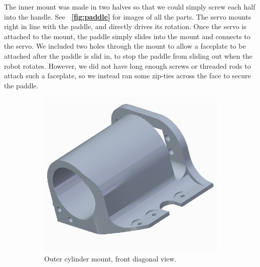 \documentclass[letterpaper, 11pt]{article}
\newcommand*{\figref}[1]{\textbf{\figurename~\ref{#1}}}
\begin{document}
The inner mount was made in two halves so that we could simply screw each half into the handle. See \figref{fig:paddle} for images of all the parts. The servo mounts right in line with the paddle, and directly drives its rotation. Once the servo is attached to the mount, the paddle simply slides into the mount and connects to the servo. We included two holes through the mount to allow a faceplate to be attached after the paddle is slid in, to stop the paddle from sliding out when the robot rotates. However, we did not have long enough screws or threaded rods to attach such a faceplate, so we instead ran some zip-ties across the face to secure the paddle.

\begin{figure}[ht]
    \centering
    \begin{subfigure}[t]{0.48\textwidth}
        \centering
        \includegraphics[height=0.25\textheight]{images/outer-mount1.png}
        \caption{Outer cylinder mount, front diagonal view.}
    \end{subfigure}\hfill
    \begin{subfigure}[t]{0.48\textwidth}
        \centering

\end{subfigure}
\end{figure}
\end{document}
